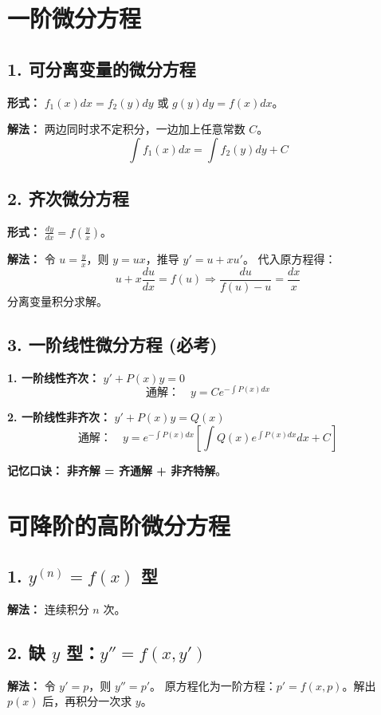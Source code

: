 \documentclass[a4paper,12pt]{ctexart}
\newenvironment{purplebox}
  {\begin{tcolorbox}[colback=white, colframe=boxpurple, boxrule=1pt, sharp corners, title=\textbf{定义/定理/核心公式}]}
  {\end{tcolorbox}}
\begin{document}
\section{一阶微分方程}

\subsection{1. 可分离变量的微分方程}
\textbf{形式：} $f_1(x)dx = f_2(y)dy$ 或 $g(y)dy = f(x)dx$。

\textbf{解法：} 两边同时求不定积分，一边加上任意常数 $C$。
\[ \int f_1(x) dx = \int f_2(y) dy + C \]

\subsection{2. 齐次微分方程}
\textbf{形式：} $\frac{dy}{dx} = f\left(\frac{y}{x}\right)$。

\textbf{解法：}
令 $u = \frac{y}{x}$，则 $y = ux$，推导 $y' = u + x u'$。
代入原方程得：
\[ u + x \frac{du}{dx} = f(u) \Rightarrow \frac{du}{f(u) - u} = \frac{dx}{x} \]
分离变量积分求解。

\subsection{3. 一阶线性微分方程 (必考)}

\begin{purplebox}
    \textbf{1. 一阶线性齐次：} $y' + P(x)y = 0$
    \[ \text{通解：} \quad y = C e^{-\int P(x) dx} \]

    \textbf{2. 一阶线性非齐次：} $y' + P(x)y = Q(x)$
    \[ \text{通解：} \quad y = e^{-\int P(x) dx} \left[ \int Q(x) e^{\int P(x) dx} dx + C \right] \]
\end{purplebox}

\textbf{记忆口诀：} \textbf{非齐解 = 齐通解 + 非齐特解}。

\section{可降阶的高阶微分方程}

\subsection{1. $y^{(n)} = f(x)$ 型}
\textbf{解法：} 连续积分 $n$ 次。

\subsection{2. 缺 $y$ 型：$y'' = f(x, y')$}
\textbf{解法：} 令 $y' = p$，则 $y'' = p'$。
原方程化为一阶方程：$p' = f(x, p)$。解出 $p(x)$ 后，再积分一次求 $y$。
\end{document}
